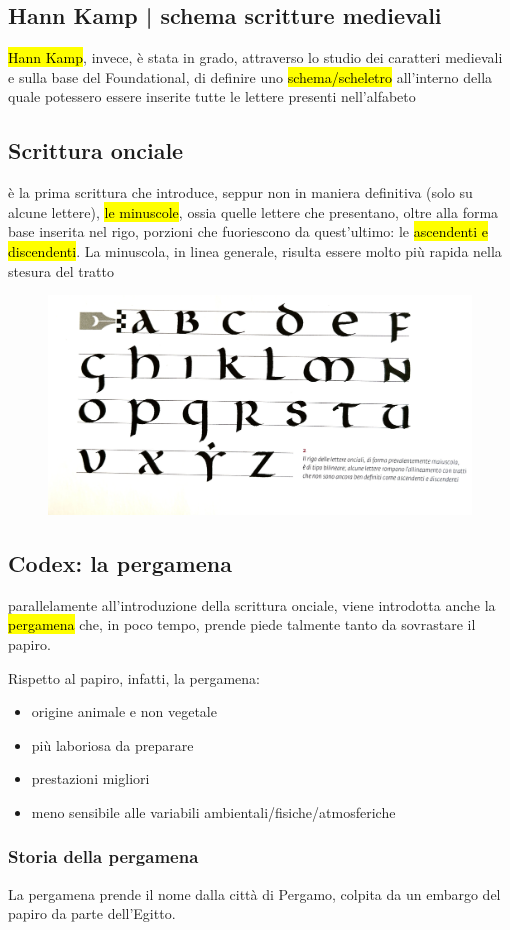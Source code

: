 \subsection{Hann Kamp | schema scritture medievali}
\hl{Hann Kamp}, invece, è stata in grado, attraverso lo studio dei caratteri medievali e sulla base del Foundational, di definire uno \hl{schema/scheletro} all'interno della quale potessero essere inserite tutte le lettere presenti nell'alfabeto
\subsection{Scrittura onciale}
è la prima scrittura che introduce, seppur non in maniera definitiva (solo su alcune lettere), \hl{le minuscole}, ossia quelle lettere che presentano, oltre alla forma base inserita nel rigo, porzioni che fuoriescono da quest'ultimo: le \hl{ascendenti e discendenti}. La minuscola, in linea generale, risulta essere molto più rapida nella stesura del tratto 
\begin{figure}[H]
    \centering
    \includegraphics[width=0.4\linewidth]{blocco_3 - storia della scrittura/imgs/onciale.jpg}
\end{figure}
\subsection{Codex: la pergamena}
parallelamente all'introduzione della scrittura onciale, viene introdotta anche la \hl{pergamena} che, in poco tempo, prende piede talmente tanto da sovrastare il papiro.

Rispetto al papiro, infatti, la pergamena:
\begin{itemize}
    \item origine animale e non vegetale
    \item più laboriosa da preparare
    \item prestazioni migliori
    \item meno sensibile alle variabili ambientali/fisiche/atmosferiche
\end{itemize}
\subsubsection{Storia della pergamena}
La pergamena prende il nome dalla città di Pergamo, colpita da un embargo del papiro da parte dell'Egitto.

